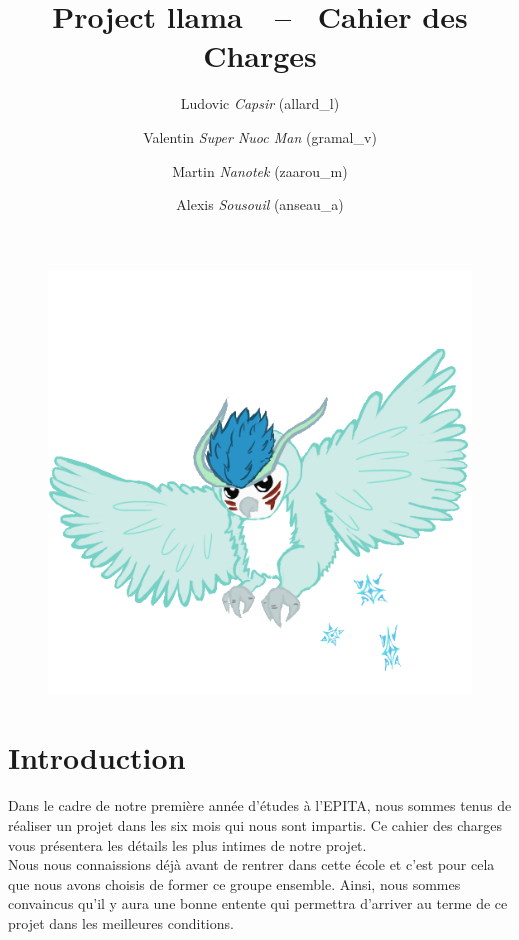 \documentclass[12pt,a4paper]{article}
\title{Project llama~~--~ Cahier des Charges}
\date{}
\author{
                Ludovic \textit{Capsir} (allard\_l) \and
                Valentin \textit{Super Nuoc Man} (gramal\_v) \and
                Martin \textit{Nanotek} (zaarou\_m) \and
                Alexis \textit{Sousouil} (anseau\_a) \and
}
\begin{document}
\maketitle
\begin{figure}[hp]
          \centering
          \includegraphics[width=1.00\textwidth]{ice_owl_clear.png}
          
\end{figure}


\newpage
\tableofcontents
\newpage

\section*{Introduction}

Dans le cadre de notre première année d'études à l'EPITA, nous sommes tenus de réaliser un projet dans les six mois qui nous sont impartis. Ce cahier des charges vous présentera les détails les plus intimes de notre projet.\\

Nous nous connaissions déjà avant de rentrer dans cette école et c'est pour cela que nous avons choisis de former ce groupe ensemble. Ainsi, nous sommes convaincus qu'il y aura une bonne entente qui permettra d'arriver au terme de ce projet dans les meilleures conditions.\\
\end{document}
